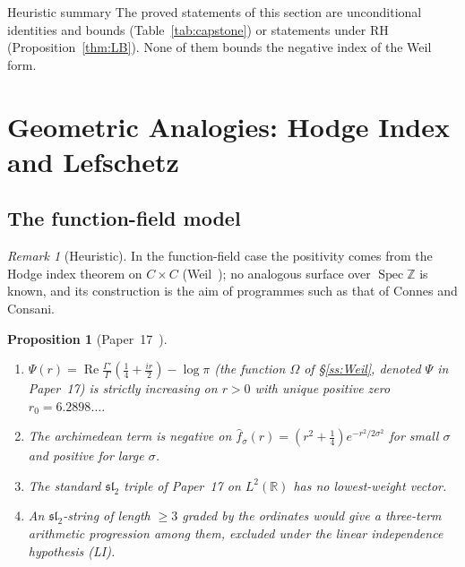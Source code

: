 \documentclass[11pt]{amsart}
\newtheorem{proposition}[theorem]{Proposition}
\theoremstyle{definition}
\theoremstyle{remark}
\newtheorem{remark}[theorem]{Remark}
\renewcommand{\Re}{\operatorname{Re}}
\newcommand{\Spec}{\operatorname{Spec}}
\begin{document}
\begin{nogobox}{Heuristic summary}
The proved statements of this section are unconditional identities and bounds
(Table~\ref{tab:capstone}) or statements under RH (Proposition~\ref{thm:LB}). None of them
bounds the negative index of the Weil form.
\end{nogobox}

\section{Geometric Analogies: Hodge Index and Lefschetz}
\label{sec:geometric}

\subsection{The function-field model}

\begin{remark}[Heuristic]
In the function-field case the positivity comes from the Hodge index theorem on $C\times C$
(Weil~\cite{Weil48}); no analogous surface over $\Spec\mathbb Z$ is known, and its
construction is the aim of programmes such as that of Connes and Consani.
\end{remark}

\begin{proposition}[{Paper~17~\cite[Props.~3.1, 4.1, 5.1, 7.1]{P17}}]
\label{thm:lefschetz}
\begin{enumerate}[label=\upshape(\roman*)]
\item $\Psi(r)=\Re\frac{\Gamma'}{\Gamma}(\tfrac14+\tfrac{ir}2)-\log\pi$ \textup{(}the function $\Omega$ of \S\ref{ss:Weil}, denoted $\Psi$ in Paper~17\textup{)} is strictly increasing on
$r>0$ with unique positive zero $r_0=6.2898\ldots$.
\item The archimedean term is negative on $\widehat f_\sigma(r)=(r^2+\frac14)e^{-r^2/2\sigma^2}$
for small $\sigma$ and positive for large $\sigma$.
\item The standard $\mathfrak{sl}_2$ triple of Paper~17 on $L^2(\mathbb R)$ has no
lowest-weight vector.
\item An $\mathfrak{sl}_2$-string of length $\ge3$ graded by the ordinates would give a
three-term arithmetic progression among them, excluded under the linear independence
hypothesis (LI).
\end{enumerate}
\end{proposition}
\end{document}
